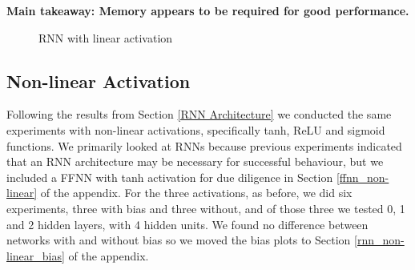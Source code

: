 \documentclass[12pt]{article}
\begin{document}
\textbf{Main takeaway: Memory appears to be required for good performance.}


\begin{figure}[!tbp]
  \centering
  \hfill
  \hfill
  
  
 \caption{RNN with linear activation}
 \label{fig:rnn_linear}	
\end{figure}	

	
					
\subsection{Non-linear Activation}\label{non-linear}

Following the results from Section \ref{RNN Architecture} we conducted the same experiments with non-linear activations, specifically tanh, ReLU and sigmoid functions. 
We primarily looked at RNNs because previous experiments indicated that an RNN architecture may be necessary for successful behaviour, but we included a FFNN with tanh activation for due diligence in Section \ref{ffnn_non-linear} of the appendix. 
For the three activations, as before, we did six experiments, three with bias and three without, and of those three we tested 0, 1 and 2 hidden layers, with 4 hidden units.
We found no difference between networks with and without bias so we moved the bias plots to Section \ref{rnn_non-linear_bias} of the appendix.\\
\end{document}
